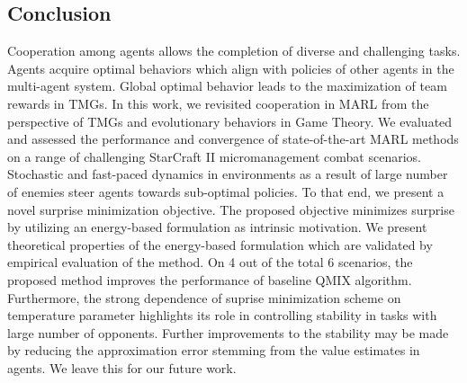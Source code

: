 \documentclass{article}
\begin{document}
\begin{multicols}{2}
\section{Conclusion}
Cooperation among agents allows the completion of diverse and challenging tasks. Agents acquire optimal behaviors which align with policies of other agents in the multi-agent system. Global optimal behavior leads to the maximization of team rewards in TMGs. In this work, we revisited cooperation in MARL from the perspective of TMGs and evolutionary behaviors in Game Theory. We evaluated and assessed the performance and convergence of state-of-the-art MARL methods on a range of challenging StarCraft II micromanagement combat scenarios. Stochastic and fast-paced dynamics in environments as a result of large number of enemies steer agents towards sub-optimal policies. To that end, we present a novel surprise minimization objective. The proposed objective minimizes surprise by utilizing an energy-based formulation as intrinsic motivation. We present theoretical properties of the energy-based formulation which are validated by empirical evaluation of the method. On 4 out of the total 6 scenarios, the proposed method improves the performance of baseline QMIX algorithm. Furthermore, the strong dependence of suprise minimization scheme on temperature parameter highlights its role in controlling stability in tasks with large number of opponents. Further improvements to the stability may be made by reducing the approximation error stemming from the value estimates in agents. We leave this for our future work. 

 
\footnotesize{}
\end{multicols}

\end{document}
